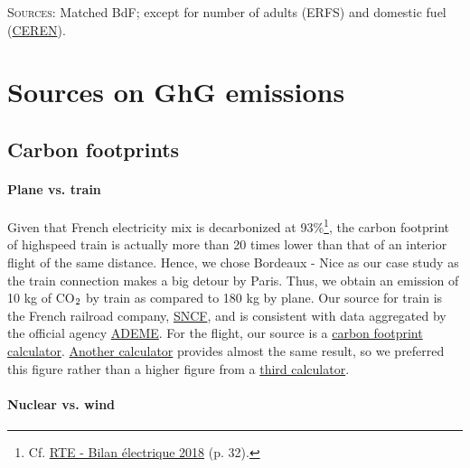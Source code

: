 \documentclass[english,5p,authoryear]{elsarticle}
\begin{document}
\begin{appendices}
\begin{table}[!htbp]
     \footnotesize{\textsc{Sources:} Matched BdF; except for number of adults (ERFS) and domestic fuel (\hyperlink{https://www.lesechos.fr/industrie-services/energie-environnement/le-chauffage-au-fioul-devient-de-plus-en-plus-cher-147372}{CEREN}).}
\end{table}

\section{Sources on GhG emissions\label{app:sources}}

\subsection{Carbon footprints\label{app:footprint}}

\paragraph{Plane vs. train}

Given that French electricity mix is decarbonized at 93\%\footnote{Cf. \hyperlink{https://www.rte-france.com/sites/default/files/be_pdf_2018v3.pdf}{RTE - Bilan électrique 2018} (p. 32).}, the carbon footprint of highspeed train is actually more than 20 times lower than that of an interior flight of the same distance. Hence, we chose Bordeaux - Nice as our case study as the train connection makes a big detour by Paris. Thus, we obtain an emission of 10 kg of CO$_\textnormal{2}$ by train as compared to 180 kg by plane. Our source for train is the French railroad company, \hyperlink{https://www.oui.sncf/aide/calcul-des-emissions-de-co2-sur-votre-trajet-en-train}{SNCF}, and is consistent with data aggregated by the official agency \hyperlink{basecarbone.fr}{ADEME}. For the flight, our source is a  \hyperlink{https://calculator.carbonfootprint.com/calculator.aspx?tab=3}{carbon footprint calculator}. \hyperlink{http://www.climatecare.org/home.aspx}{Another calculator} provides almost the same result, so we preferred this figure rather than a higher figure from a \hyperlink{https://co2.myclimate.org/fr/flight_calculators}{third calculator}.

\paragraph{Nuclear vs. wind}


\end{appendices}
\end{document}
